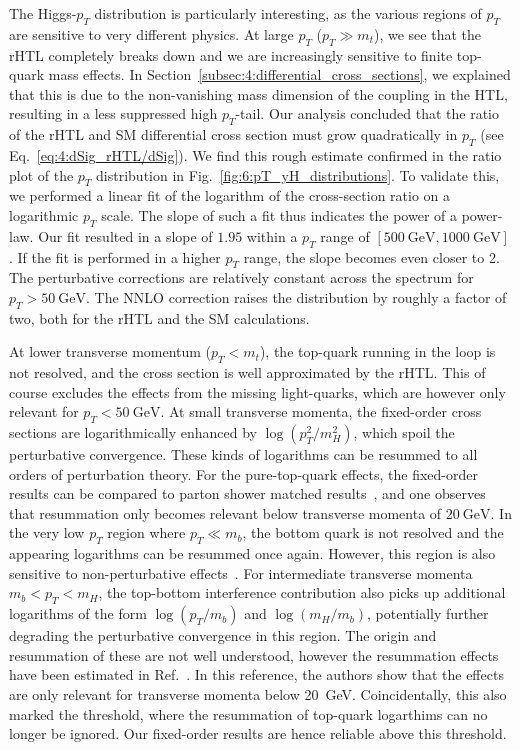 The Higgs-$p_T$ distribution is particularly interesting, as the various regions of $p_T$ are sensitive to very different physics. At large $p_T$ ($p_T\gg m_t$), we see that the \acs{rHTL} completely breaks down and we are increasingly sensitive to finite top-quark mass effects. In Section~\ref{subsec:4:differential_cross_sections}, we explained that this is due to the non-vanishing mass dimension of the coupling in the \acs{HTL}, resulting in a less suppressed high $p_T$-tail. Our analysis concluded that the ratio of the \acs{rHTL} and \acs{SM} differential cross section must grow quadratically in $p_T$ (see Eq.~\eqref{eq:4:dSig_rHTL/dSig}). We find this rough estimate confirmed in the ratio plot of the $p_T$ distribution in Fig.~\ref{fig:6:pT_yH_distributions}. To validate this, we performed a linear fit of the logarithm of the cross-section ratio on a logarithmic $p_T$ scale. The slope of such a fit thus indicates the power of a power-law. Our fit resulted in a slope of $1.95$ within a $p_T$ range of $[500\ \mathrm{GeV}, 1000\ \mathrm{GeV}]$. If the fit is performed in a higher $p_T$ range, the slope becomes even closer to 2. The perturbative corrections are relatively constant across the spectrum for $p_T > 50\ \mathrm{GeV}$. The \acs{NNLO} correction raises the distribution by roughly a factor of two, both for the \acs{rHTL} and the \acs{SM} calculations.

At lower transverse momentum ($p_T < m_t$), the top-quark running in the loop is not resolved, and the cross section is well approximated by the \acs{rHTL}. This of course excludes the effects from the missing light-quarks, which are however only relevant for $p_T < 50\ \mathrm{GeV}$. At small transverse momenta, the fixed-order cross sections are logarithmically enhanced by $\log (p_T^2/m_H^2)$, which spoil the perturbative convergence. These kinds of logarithms can be resummed to all orders of perturbation theory. For the pure-top-quark effects, the fixed-order results can be compared to parton shower matched results~\cite{Niggetiedt:2024nmp}, and one observes that resummation only becomes relevant below transverse momenta of $20\ \mathrm{GeV}$. In the very low $p_T$ region where $p_T \ll m_b$, the bottom quark is not resolved and the appearing logarithms can be resummed once again. However, this region is also sensitive to non-perturbative effects~\cite{Kulesza:2003wi}. For intermediate transverse momenta  $m_b < p_T < m_H$, the top-bottom interference contribution also picks up additional logarithms of the form $\log (p_T/m_b)$ and $\log (m_H/m_b)$, potentially further degrading the perturbative convergence in this region. The origin and resummation of these are not well understood, however the resummation effects have been estimated in Ref.~\cite{Caola:2018zye}. In this reference, the authors show that the effects are only relevant for transverse momenta below 20~GeV. Coincidentally, this also marked the threshold, where the resummation of top-quark logarthims can no longer be ignored. Our fixed-order results are hence reliable above this threshold.

